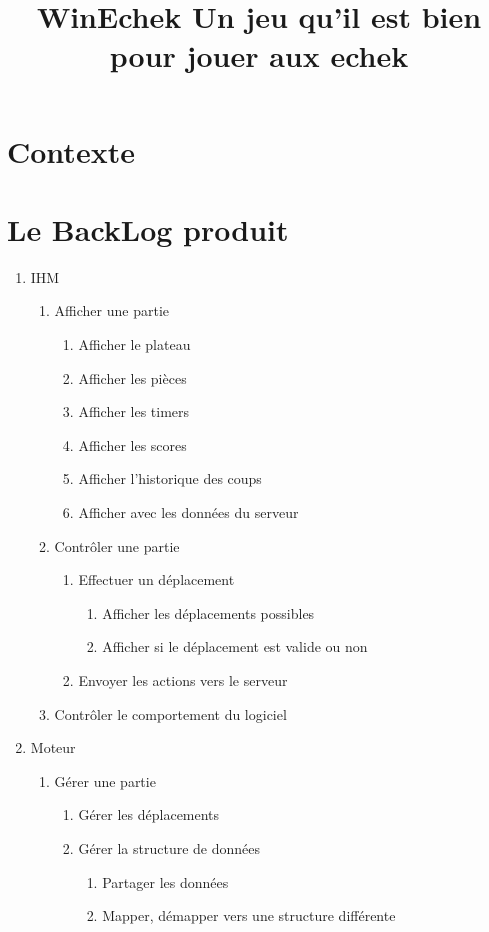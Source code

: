 \documentclass{article}
\title{%
    \begin{minipage}\linewidth
        \centering \bfseries
        WinEchek
        \vskip3pt
        \large Un jeu qu'il est bien pour jouer aux echek
    \end{minipage}
}
\date{}
\begin{document}
\renewcommand{\labelitemi}{$\bullet$}
\renewcommand{\labelitemii}{$\circ$}
\renewcommand{\labelitemiii}{$-$}
\renewcommand{\labelitemiv}{$\triangleright$}

\maketitle

\section{Contexte}


\section{Le BackLog produit}
\begin{enumerate}
 \item IHM
 \begin{enumerate}
  \item Afficher une partie
  \begin{enumerate}
   \item Afficher le plateau
   \item Afficher les pièces
   \item Afficher les timers
   \item Afficher les scores
   \item Afficher l'historique des coups
   \item Afficher avec les données du serveur
  \end{enumerate}
  \item Contrôler une partie
  \begin{enumerate}
   \item Effectuer un déplacement
   \begin{enumerate}
    \item Afficher les déplacements possibles
    \item Afficher si le déplacement est valide ou non
   \end{enumerate}
    \item Envoyer les actions vers le serveur
  \end{enumerate}

  \item Contrôler le comportement du logiciel
 \end{enumerate}
  \item Moteur
  \begin{enumerate}
   \item Gérer une partie
   \begin{enumerate}
    \item Gérer les déplacements
    \item Gérer la structure de données
    \begin{enumerate}
     \item Partager les données
     \item Mapper, démapper vers une structure différente
    \end{enumerate}


\end{enumerate}
\end{enumerate}
\end{enumerate}
\end{document}
